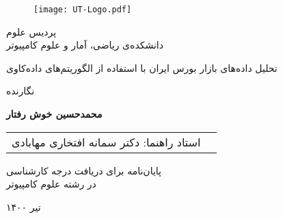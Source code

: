 \documentclass[12pt]{report}
\begin{document}

\begin{figure}
\centering
\texttt{[image: UT-Logo.pdf]}
\end{figure}

\begin{center}
پردیس علوم
\\
دانشکده‌ی ریاضی، آمار و علوم کامپیوتر
\end{center}

\begin{center}
\end{center}

\begin{center}
\huge{ تحلیل داده‌های بازار بورس ایران با استفاده از الگوریتم‌های داده‌کاوی}
\end{center}

\begin{center}
\end{center}

\begin{center}
نگارنده
\end{center}
\begin{center}
\textbf{
محمدحسین خوش رفتار
}
\end{center}

\begin{center}
\begin{tabular}{rr}
استاد راهنما: دکتر سمانه افتخاری مهابادی
\end{tabular}
\end{center}

\vspace{3cm}
\begin{center}
پایان‌نامه برای دریافت درجه کارشناسی
\\
در رشته علوم کامپیوتر
\end{center}

\begin{center}
تیر ۱۴۰۰
\end{center}

\pagestyle{empty}
\pagenumbering{}

\newpage
\pagestyle{plain}
\setcounter{page}{1}
\doublespacing{}
\chapter*{}
\end{document}
